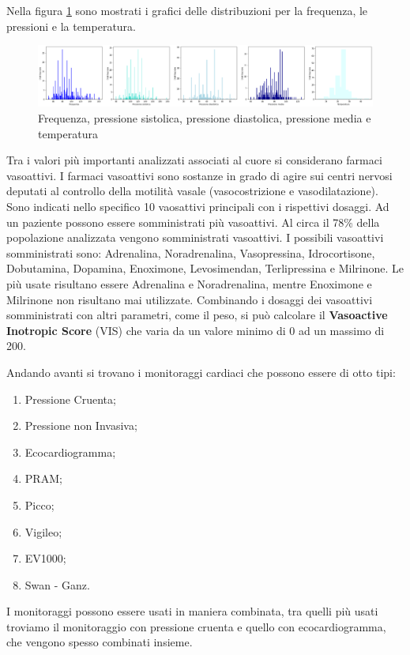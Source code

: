  Nella figura \ref{fig:cuore} sono mostrati i grafici delle distribuzioni per la frequenza, le pressioni e la temperatura.
\begin{figure}[h]
	\includegraphics[width=15cm]{capitolo1/cuore.png}
	\centering
	\caption{Frequenza, pressione sistolica, pressione diastolica, pressione media e temperatura}
	\label{fig:cuore}
\end{figure}

Tra i valori più importanti analizzati associati al cuore si considerano farmaci vasoattivi. 
I farmaci vasoattivi sono sostanze in grado di agire sui centri nervosi deputati al controllo della motilità vasale (vasocostrizione e vasodilatazione). Sono indicati nello specifico 10 vaosattivi principali con i rispettivi dosaggi. Ad un paziente possono essere somministrati più vasoattivi. Al circa il 78\% della popolazione analizzata vengono somministrati vasoattivi.
I possibili vasoattivi somministrati sono: Adrenalina, Noradrenalina, Vasopressina, Idrocortisone, Dobutamina, Dopamina, Enoximone, Levosimendan, Terlipressina e Milrinone.
Le più usate risultano essere Adrenalina e Noradrenalina, mentre Enoximone e Milrinone non risultano mai utilizzate.
Combinando i dosaggi dei vasoattivi somministrati con altri parametri, come il peso, si può calcolare il \textbf{Vasoactive Inotropic Score} (VIS) che varia da un valore minimo di 0 ad un massimo di 200.

Andando avanti si trovano i monitoraggi cardiaci che possono essere di otto tipi: 
\begin{enumerate}
	\item Pressione Cruenta;
	\item Pressione non Invasiva;
	\item Ecocardiogramma;
	\item PRAM;
	\item Picco;
	\item Vigileo;
	\item EV1000;
	\item Swan - Ganz.
\end{enumerate}
I monitoraggi possono essere usati in maniera combinata, tra quelli più usati troviamo il monitoraggio con pressione cruenta e quello con ecocardiogramma, che vengono spesso combinati insieme. 
 
